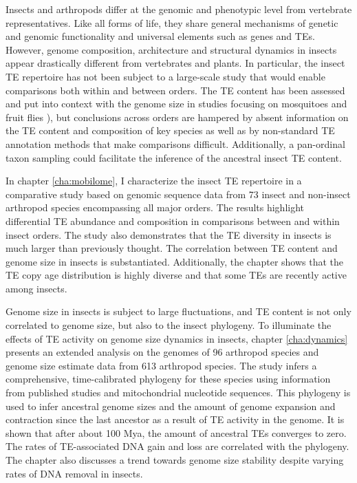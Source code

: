 Insects and arthropods differ at the genomic and phenotypic level from
vertebrate representatives. Like all forms of life, they share general
mechanisms of genetic and genomic functionality and universal elements
such as genes and TEs. However, genome composition, architecture and
structural dynamics in insects appear drastically different from
vertebrates and plants. In particular, the insect TE repertoire has not
been subject to a large-scale study that would enable comparisons both
within and between orders. The TE content has been assessed and put into
context with the genome size in studies focusing on mosquitoes
\citep{Neafsey2015} and  fruit flies
\citep{Sessegolo2016}), but conclusions across orders are hampered by
absent information on the TE content and composition of key species as
well as by non-standard TE annotation methods that make comparisons
difficult. Additionally, a pan-ordinal taxon sampling could facilitate
the inference of the ancestral insect TE content. 


In chapter \ref{cha:mobilome}, I characterize the insect TE repertoire
in a comparative study based on genomic sequence data from 73 insect and
non-insect arthropod species encompassing all major orders. The results
highlight differential TE abundance and composition in comparisons
between and within insect orders. The study also demonstrates that the
TE diversity in insects is much larger than previously thought. The
correlation between TE content and genome size in insects is
substantiated. Additionally, the chapter shows that the TE copy age
distribution is highly diverse and that some TEs are recently active
among insects.


Genome size in insects is subject to large fluctuations, and TE content
is not only correlated to genome size, but also to the insect phylogeny.
To illuminate the effects of TE activity on genome size dynamics in
insects, chapter \ref{cha:dynamics} presents an extended analysis on the
genomes of 96 arthropod species and genome size estimate data from 613
arthropod species. The study infers a comprehensive, time-calibrated
phylogeny for these species using information from published studies and
mitochondrial nucleotide sequences. This phylogeny is used to infer
ancestral genome sizes and the amount of genome expansion and
contraction since the last ancestor as a result of TE activity in the
genome. It is shown that after about 100 Mya, the amount of ancestral
TEs converges to zero. The rates of TE-associated DNA gain and loss are
correlated with the phylogeny. The chapter also discusses a trend
towards genome size stability despite varying rates of DNA removal in
insects.

